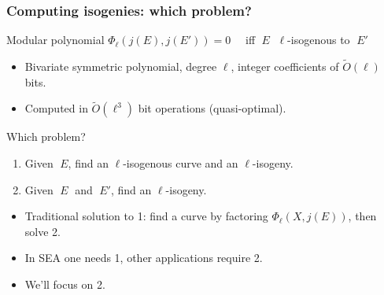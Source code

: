 \documentclass[10pt]{beamer}
\newcommand{\0}{\mathcal{O}}  %
\newcommand{\tildO}{\tilde{O}}  %
\begin{document}
\begin{frame}
  \frametitle{Computing isogenies: which problem?}

  \begin{block}{Modular polynomial}
    \centering
    $\Phi_\ell(j(E),j(E')) = 0\quad$ iff $\;E\;$ $\ell$-isogenous to $\;E'\;$

    \begin{itemize}
    \item Bivariate symmetric polynomial, degree $\ell$, integer coefficients of
      $\tildO(\ell)$ bits.
    \item Computed in $\tildO(\ell^3)$ bit operations (quasi-optimal).
    \end{itemize}
  \end{block}

  \begin{block}{Which problem?}
    \begin{enumerate}
    \item Given $\;E$, find an $\ell$-isogenous curve and an $\ell$-isogeny.
    \item Given $\;E\;$ and $\;E'$, find an $\ell$-isogeny.
    \end{enumerate}
    \begin{itemize}
    \item Traditional solution to 1: find a curve by factoring
      $\Phi_\ell(X,j(E))$, then solve 2.
    \item In SEA one needs 1, other applications require 2.
    \item We'll focus on 2.
    \end{itemize}
  \end{block}
\end{frame}

\end{document}
